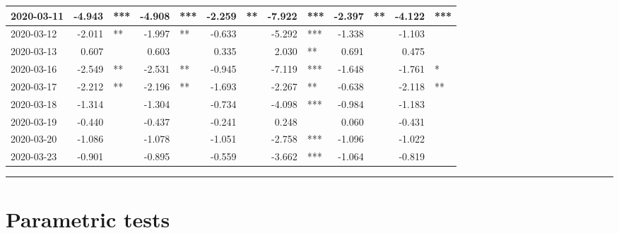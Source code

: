 \documentclass[
]{article}
\begin{document}
\begin{table}
\begin{tabular}[t]{l|r|l|r|l|r|l|r|l|r|l|r|l}
\hline
2020-03-11 & -4.943 & *** & -4.908 & *** & -2.259 & ** & -7.922 & *** & -2.397 & ** & -4.122 & ***\\
\hline
2020-03-12 & -2.011 & ** & -1.997 & ** & -0.633 &  & -5.292 & *** & -1.338 &  & -1.103 & \\
\hline
2020-03-13 & 0.607 &  & 0.603 &  & 0.335 &  & 2.030 & ** & 0.691 &  & 0.475 & \\
\hline
2020-03-16 & -2.549 & ** & -2.531 & ** & -0.945 &  & -7.119 & *** & -1.648 &  & -1.761 & *\\
\hline
2020-03-17 & -2.212 & ** & -2.196 & ** & -1.693 &  & -2.267 & ** & -0.638 &  & -2.118 & **\\
\hline
2020-03-18 & -1.314 &  & -1.304 &  & -0.734 &  & -4.098 & *** & -0.984 &  & -1.183 & \\
\hline
2020-03-19 & -0.440 &  & -0.437 &  & -0.241 &  & 0.248 &  & 0.060 &  & -0.431 & \\
\hline
2020-03-20 & -1.086 &  & -1.078 &  & -1.051 &  & -2.758 & *** & -1.096 &  & -1.022 & \\
\hline
2020-03-23 & -0.901 &  & -0.895 &  & -0.559 &  & -3.662 & *** & -1.064 &  & -0.819 & \\
\hline
\end{tabular}
\end{table}

\begin{center}\rule{0.5\linewidth}{0.5pt}\end{center}

\hypertarget{parametric-tests}{%
\section{Parametric tests}\label{parametric-tests}}
\end{document}

